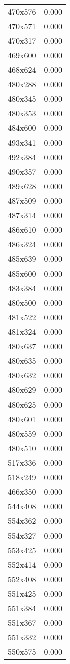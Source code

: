 \begin{table}
\begin{tabular}{lr}
470x576 & 0.000 \\
470x571 & 0.000 \\
470x317 & 0.000 \\
469x600 & 0.000 \\
468x624 & 0.000 \\
480x288 & 0.000 \\
480x345 & 0.000 \\
480x353 & 0.000 \\
484x600 & 0.000 \\
493x341 & 0.000 \\
492x384 & 0.000 \\
490x357 & 0.000 \\
489x628 & 0.000 \\
487x509 & 0.000 \\
487x314 & 0.000 \\
486x610 & 0.000 \\
486x324 & 0.000 \\
485x639 & 0.000 \\
485x600 & 0.000 \\
483x384 & 0.000 \\
480x500 & 0.000 \\
481x522 & 0.000 \\
481x324 & 0.000 \\
480x637 & 0.000 \\
480x635 & 0.000 \\
480x632 & 0.000 \\
480x629 & 0.000 \\
480x625 & 0.000 \\
480x601 & 0.000 \\
480x559 & 0.000 \\
480x510 & 0.000 \\
517x336 & 0.000 \\
518x249 & 0.000 \\
466x350 & 0.000 \\
544x408 & 0.000 \\
554x362 & 0.000 \\
554x327 & 0.000 \\
553x425 & 0.000 \\
552x414 & 0.000 \\
552x408 & 0.000 \\
551x425 & 0.000 \\
551x384 & 0.000 \\
551x367 & 0.000 \\
551x332 & 0.000 \\
550x575 & 0.000 \\

\end{tabular}
\end{table}
